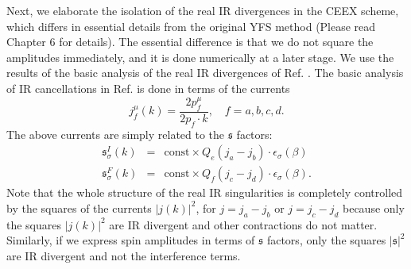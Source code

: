 Next, we elaborate the isolation of the real IR divergences in the CEEX scheme, which differs in essential details from the original YFS method \cite{YFS} (Please read Chapter 6 for details). The essential difference is that we do not square the amplitudes immediately, and it is done numerically at a later stage. We use the results of the basic analysis of the real IR divergences of Ref. \cite{YFS}. The basic analysis of IR cancellations in Ref. \cite{YFS} is done in terms of the currents
\begin{equation}
j^\mu_f(k)=\frac{2p^\mu_f}{2p_f\cdot k},\quad f=a,b,c,d.
\end{equation}
The above currents are simply related to the $\mathfrak{s}$ factors:
\begin{eqnarray}
\mathfrak{s}^{I}_\sigma(k)&=&\text{const}\times Q_e(j_a-j_b)\cdot\epsilon_\sigma(\beta)\nonumber\\
\mathfrak{s}^{F}_\sigma(k)&=&\text{const}\times Q_f(j_c-j_d)\cdot\epsilon_\sigma(\beta).
\end{eqnarray}
Note that the whole structure of the real IR singularities is completely controlled by the squares of the currents $|j(k)|^2$, for $j=j_a-j_b$ or $j=j_c-j_d$ because only the squares $|j(k)|^2$ are IR divergent and other contractions do not matter. Similarly, if we express spin amplitudes in terms of $\mathfrak{s}$ factors, only the squares $|\mathfrak{s}|^2$ are IR divergent and not the interference terms.

